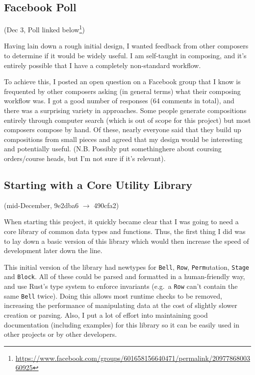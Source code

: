 \documentclass[12pt]{article}
\begin{document}
\subsection{Facebook Poll}

(Dec 3, Poll linked
below\footnote{\url{https://www.facebook.com/groups/601658156640471/permalink/2097786800360925}})

Having lain down a rough initial design, I wanted feedback from other composers to determine if it
would be widely useful.  I am self-taught in composing, and it's entirely possible that I have a
completely non-standard workflow.

To achieve this, I posted an open question on a Facebook group that I know is frequented by other
composers asking (in general terms) what their composing workflow was.  I got a good number of
responses (64 comments in total), and there was a surprising variety in approaches.  Some people
generate compositions entirely through computer search (which is out of scope for this project) but
most composers compose by hand.  Of these, nearly everyone said that they build up compositions from
small pieces and agreed that my design would be interesting and potentially useful.  (N.B. Possibly
put somethinghere about coursing orders/course heads, but I'm not sure if it's relevant).

\subsection{Starting with a Core Utility Library}

(mid-December, 9e2dba6 $\to$ 490cfa2)

When starting this project, it quickly became clear that I was going to need a core library of
common data types and functions.  Thus, the first thing I did was to lay down a basic version of
this library which would then increase the speed of development later down the line.

This initial version of the library had newtypes for \verb|Bell|, \verb|Row|, \verb|Perm|utation,
\verb|Stage| and \verb|Block|.  All of these could be parsed and formatted in a human-friendly way,
and use Rust's type system to enforce invariants (e.g.\ a \verb|Row| can't contain the same
\verb|Bell| twice).  Doing this allows most runtime checks to be removed, increasing the performance
of manipulating data at the cost of slightly slower creation or parsing.  Also, I put a lot of
effort into maintaining good documentation (including examples) for this library so it can be easily
used in other projects or by other developers.
\end{document}
